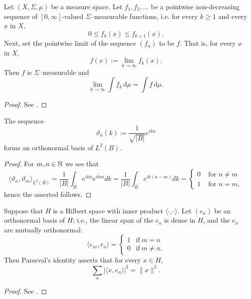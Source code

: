 \begin{atheorem} \label{athm:monotonconvthm}
	Let $(X, \Sigma, \mu)$ be a measure space. Let $f_1, f_2, \ldots$  be a pointwise non-decreasing sequence of $[0, \infty]$-valued $\Sigma$–measurable functions, i.e. for every $k \geq 1$ and every $x$ in $X$,
		\[ 0 \leq f_k(x) \leq f_{k+1}(x). \] 
	Next, set the pointwise limit of the sequence $(f_{n})$ to be $f$. That is, for every $x$ in $X$,
		\[ f(x):= \lim_{k\to\infty} f_k(x). \]
	Then $f$ is $\Sigma$–measurable and
		\[ \lim_{k\to\infty} \int f_k \, \mathrm{d}\mu = \int f \, \mathrm{d}\mu. \]

	\begin{proof}
		See \cite[p. 516]{werner2006funkana}.
	\end{proof}
\end{atheorem}

\begin{atheorem} \label{athm:eta}
	The sequence
		\[ \vartheta_{n}(k) \coloneqq \frac{1}{\sqrt{|B|}} e^{ikn} \]
	forms an orthonormal basis of $L^{2}(B)$.

	\begin{proof}
		 For $m, n \in \mathbb{N}$ we see that
		 \[ \langle \vartheta_{n}, \vartheta_{m} \rangle_{L^{2}(B)} = \frac{1}{|B|} \int_{B} e^{ikn} \overline{e^{ikm}} dk = \frac{1}{|B|} \int_{B} e^{ik(n-m)} dk = \begin{cases} 0 & \text{ for } n \neq m \\ 1 & \text{ for } n = m, \end{cases} \]
		 hence the asserted follows.
	\end{proof}
\end{atheorem}

\begin{atheorem} \label{athm:parseval}
	Suppose that $H$ is a Hilbert space with inner product $\langle \cdot,\cdot \rangle$. Let $(e_{n})$ be an orthonormal basis of $H$; i.e., the linear span of the $e_n$ is dense in $H$, and the $e_n$ are mutually orthonormal:
		\[ \langle e_{m},e_{n}\rangle ={\begin{cases}1&{\mbox{if}}\ m=n\\0&{\mbox{if}}\ m\not =n.\end{cases}} \]
	Then Parseval's identity asserts that for every $x \in H$,
		\[ \sum _{n}|\langle x,e_{n}\rangle |^{2}=\|x\|^{2}.\]

	\begin{proof}
		See \cite[p. 236]{werner2006funkana}.
	\end{proof}
\end{atheorem}

